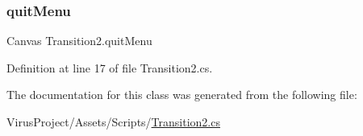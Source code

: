 \subsubsection{\texorpdfstring{quit\+Menu}{quitMenu}}
{\footnotesize\ttfamily Canvas Transition2.\+quit\+Menu}



Definition at line 17 of file Transition2.\+cs.



The documentation for this class was generated from the following file\+:\begin{DoxyCompactItemize}
\item 
Virus\+Project/\+Assets/\+Scripts/\hyperlink{_transition2_8cs}{Transition2.\+cs}\end{DoxyCompactItemize}
